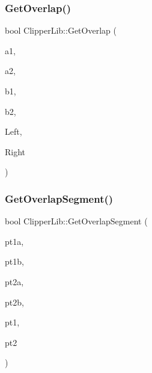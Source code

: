 \mbox{\label{namespace_clipper_lib_a489c460712308f4a5026b8618b6b319b}} 
\subsubsection{\texorpdfstring{GetOverlap()}{GetOverlap()}}
{\footnotesize\ttfamily bool Clipper\+Lib\+::\+Get\+Overlap (\begin{DoxyParamCaption}\item[{const \mbox{\hyperlink{namespace_clipper_lib_a7156730a24951629192d4831334bafaa}{c\+Int}}}]{a1,  }\item[{const \mbox{\hyperlink{namespace_clipper_lib_a7156730a24951629192d4831334bafaa}{c\+Int}}}]{a2,  }\item[{const \mbox{\hyperlink{namespace_clipper_lib_a7156730a24951629192d4831334bafaa}{c\+Int}}}]{b1,  }\item[{const \mbox{\hyperlink{namespace_clipper_lib_a7156730a24951629192d4831334bafaa}{c\+Int}}}]{b2,  }\item[{\mbox{\hyperlink{namespace_clipper_lib_a7156730a24951629192d4831334bafaa}{c\+Int}} \&}]{Left,  }\item[{\mbox{\hyperlink{namespace_clipper_lib_a7156730a24951629192d4831334bafaa}{c\+Int}} \&}]{Right }\end{DoxyParamCaption})}

\mbox{\label{namespace_clipper_lib_a8817de6dc5a080ead872b1373074c07f}} 
\subsubsection{\texorpdfstring{GetOverlapSegment()}{GetOverlapSegment()}}
{\footnotesize\ttfamily bool Clipper\+Lib\+::\+Get\+Overlap\+Segment (\begin{DoxyParamCaption}\item[{\mbox{\hyperlink{struct_clipper_lib_1_1_int_point}{Int\+Point}}}]{pt1a,  }\item[{\mbox{\hyperlink{struct_clipper_lib_1_1_int_point}{Int\+Point}}}]{pt1b,  }\item[{\mbox{\hyperlink{struct_clipper_lib_1_1_int_point}{Int\+Point}}}]{pt2a,  }\item[{\mbox{\hyperlink{struct_clipper_lib_1_1_int_point}{Int\+Point}}}]{pt2b,  }\item[{\mbox{\hyperlink{struct_clipper_lib_1_1_int_point}{Int\+Point}} \&}]{pt1,  }\item[{\mbox{\hyperlink{struct_clipper_lib_1_1_int_point}{Int\+Point}} \&}]{pt2 }\end{DoxyParamCaption})}

